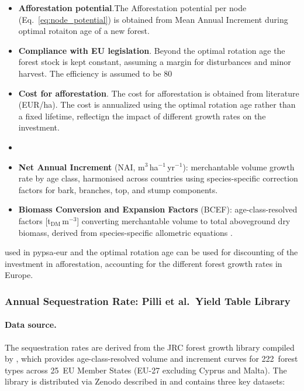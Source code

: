 \documentclass[12pt, a4paper]{article}
\begin{document}
\begin{itemize}[leftmargin=2em]

    \item \textbf{Afforestation potential}.The Afforestation potential per node  (Eq.~\ref{eq:node_potential}) is obtained from Mean Annual Increment during optimal rotaiton age of a new forest.
    \item \textbf{Compliance with EU legislation}. Beyond the optimal rotation age the forest stock is kept constant, assuming a margin for disturbances and minor harvest. The efficiency is assumed to be 80%
    \item \textbf{Cost for afforestation}. The cost for afforestation is obtained from literature (EUR/ha). The cost is annualized using the optimal rotation age rather than a fixed lifetime, reflectign the impact of different growth rates on the investment.
    \item \item \textbf{Net Annual Increment} (NAI, m$^3$\,ha$^{-1}$\,yr$^{-1}$):
          merchantable volume growth rate by age class, harmonised across
          countries using species-specific correction factors for bark,
          branches, top, and stump components.
    \item \textbf{Biomass Conversion and Expansion Factors} (BCEF):
          age-class-resolved factors [t$_{\text{DM}}$\,m$^{-3}$]
          converting merchantable volume to total aboveground dry
          biomass, derived from species-specific allometric equations
          \citep{Boudewyn2007}.
\end{itemize}
used in pypsa-eur and the optimal rotation age can be used for discounting of the investment in afforestation, accounting for the different forest growth rates in Europe.

\subsubsection{Annual Sequestration Rate: Pilli et al.\ Yield Table Library}
\label{sec:affo_rate}

\paragraph{Data source.}
The sequestration rates are derived from the JRC forest growth library compiled by \citet{Pilli2024}, which provides age-class-resolved volume and increment
curves for 222~forest types across 25~EU Member States (EU-27 excluding Cyprus
and Malta). The library is distributed via Zenodo
\cite{Pilli2024Zenodo} described in \cite{Pilli2024} and contains three key datasets:
\end{document}
